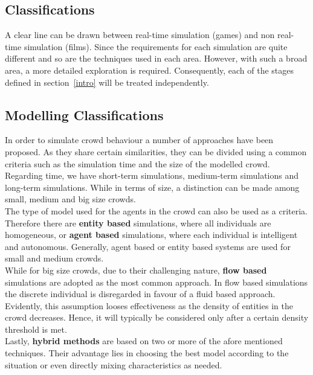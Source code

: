\documentclass[6pt]{article} %
\begin{document}
\begin{multicols}{2}
\section{Classifications}

A clear line can be drawn between real-time simulation (games) and non real-time simulation (films).
Since the requirements for each simulation are quite different and so are the techniques used in each area.
However, with such a broad area, a more detailed exploration is required.
Consequently, each of the stages defined in section~\ref{intro} will be treated independently.

\subsection{Modelling Classifications}
\label{subsec:ModelClassification}

In order to simulate crowd behaviour a number of approaches have been proposed.
As they share certain similarities, they can be divided using a common criteria such as the simulation time  and the size of the modelled crowd.\\

Regarding time, we have short-term simulations, medium-term simulations and long-term simulations.
While in terms of size, a distinction can be made among small, medium and big size crowds.\\

The type of model used for the agents in the crowd can also be used as a criteria.
Therefore there are \textbf{entity based} simulations, where all individuals are homogeneous, or \textbf{agent based} simulations, where each individual is intelligent and autonomous.
Generally, agent based or entity based systems are used for small and medium crowds.\\

While for big size crowds, due to their challenging nature, \textbf{flow based} simulations are adopted as the most common approach.
In flow based simulations the discrete individual is disregarded in favour of a fluid based approach.
Evidently, this assumption looses effectiveness as the density of entities in the crowd decreases.
Hence, it will typically be considered only after a certain density threshold is met.\\

Lastly, \textbf{hybrid methods} are based on two or more of the afore mentioned techniques.
Their advantage lies in choosing the best model according to the situation or even directly mixing characteristics as needed. 


\end{multicols}
\end{document}
